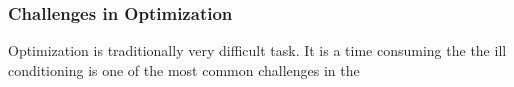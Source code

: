 \subsubsection{Challenges in Optimization}

Optimization is traditionally very difficult task. It is a time consuming the 
the ill conditioning is one of the most common challenges in the 